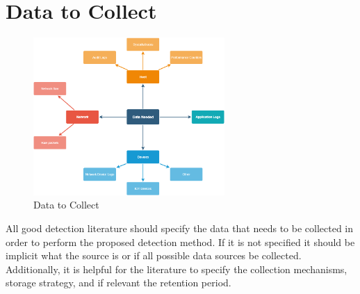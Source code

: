 \documentclass[conference]{IEEEtran}
\begin{document}
\section{Data to Collect}
\begin{figure}[h]
  \includegraphics[width=.45\textwidth,height=6cm]{Data_needed.png}
  \caption{Data to Collect}
  \label{AAA}
\end{figure}
All good detection literature should specify the data that needs to be collected in order to perform the proposed detection method. If it is not specified it should be implicit what the source is or if all possible data sources be collected. Additionally, it is helpful for the literature to specify the collection mechanisms, storage strategy, and if relevant the retention period.  
\end{document}
